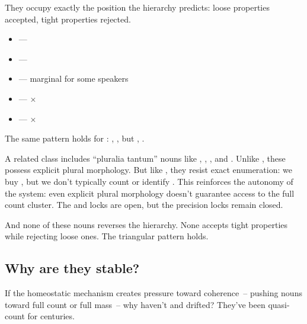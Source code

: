 They occupy exactly the position the hierarchy predicts: loose properties accepted, tight properties rejected.

\begin{itemize}
\item {} — \checkmark
\item {} — \checkmark
\item {} — marginal for some speakers
\item {} — $\times$
\item {} — $\times$
\end{itemize}

The same pattern holds for : , , but \ungram{}, \ungram{}.

A related class includes \enquote{pluralia tantum} nouns like , , , and . Unlike , these possess explicit plural morphology. But like , they resist exact enumeration: we buy , but we don't typically count \ungram{} or identify \ungram{}. This reinforces the autonomy of the system: even explicit plural morphology doesn't guarantee access to the full count cluster. The  and  locks are open, but the precision locks remain closed.

And none of these nouns reverses the hierarchy. None accepts tight properties while rejecting loose ones. The triangular pattern holds.

\subsection{Why are they stable?}
\label{sec:9:why-stable}

If the homeostatic mechanism creates pressure toward coherence~-- pushing nouns toward full count or full mass~-- why haven't  and  drifted? They've been quasi-count for centuries.

